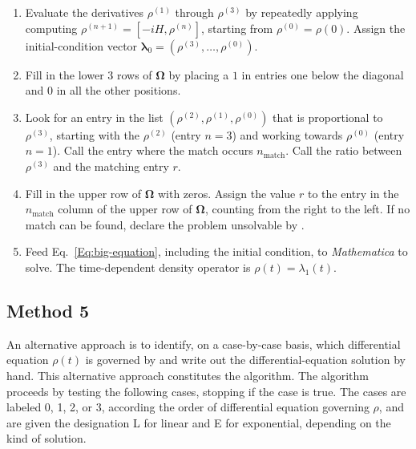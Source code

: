 \begin{enumerate}

  \item Evaluate the derivatives $\rho^{(1)}$ through $\rho^{(3)}$ by repeatedly applying computing $\rho^{(n+1)} = [-i H, \rho^{(n)}]$, starting from $\rho^{(0)} = \rho(0)$.  Assign the initial-condition vector ${\bm{\lambda}}_0 = (\rho^{(3)}, \ldots, \rho^{(0)})$.
  
  \item Fill in the lower 3 rows of $\bm{\Omega}$ by placing a $1$ in entries one below the diagonal and $0$ in all the other positions.
  
  \item  Look for an entry in the list $(\rho^{(2)}, \rho^{(1)}, \rho^{(0)})$ that is proportional to $\rho^{(3)}$, starting with the $\rho^{(2)}$ (entry $n = 3$) and working towards $\rho^{(0)}$ (entry $n = 1$). Call the entry where the match occurs $n_{\text{match}}$. Call the ratio between $\rho^{(3)}$ and the matching entry $r$.
  
  \item Fill in the upper row of $\bm{\Omega}$ with zeros.  Assign the value $r$ to the entry in the $n_{\text{match}}$ column of the upper row of $\bm{\Omega}$, counting from the right to the left.  
If no match can be found, declare the problem unsolvable by .
  
  \item Feed Eq.~\ref{Eq:big-equation}, including the initial condition, to \emph{Mathematica} to solve.  The time-dependent density operator is $\rho(t) = \lambda_{1}(t)$. 

\end{enumerate}
	
\subsection{Method 5} 

An alternative approach is to identify, on a case-by-case basis, which differential equation $\rho(t)$ is governed by and write out the differential-equation solution by hand.
This alternative approach constitutes the  algorithm. 
The algorithm proceeds by testing the following cases, stopping if the case is true.
The cases are labeled 0, 1, 2, or 3, according the order of differential equation governing $\rho$, and are given the designation L for linear and E for exponential, depending on the kind of solution. 

